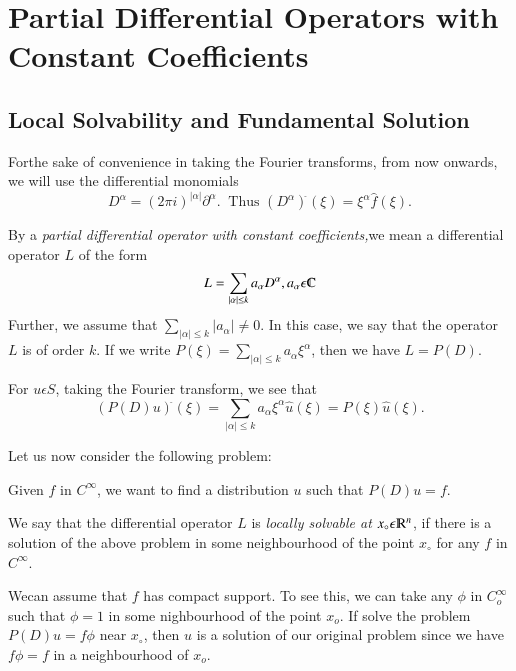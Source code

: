 \chapter{Partial Differential Operators with Constant
  Coefficients}\label{chap2} 

\section{Local Solvability and Fundamental Solution}\label{chap2:sec1}

For\pageoriginale the sake of convenience in taking the Fourier transforms, from now
onwards, we will use the differential monomials  
$$
D^{\alpha}= (2 \pi i)^{|\alpha|}\partial^{\alpha}. ~\text{ Thus }
(D^{\alpha})^{\hat{}}(\xi) = \xi^{\alpha} \hat{f}(\xi). 
$$

By a \textit{partial differential operator with constant
  coefficients,}we mean a differential operator $L$ of the form  
$$
L= \sum_{|\alpha| \leq k} a_{\alpha}D^{\alpha}, a_{\alpha} \epsilon \varmathbb{C}
$$
Further, we assume that $\sum \limits_{|\alpha| \leq k} |a_{\alpha}|
\neq 0$. In this case, we say that the operator $L$ is of order
$k$. If we write $P(\xi)= \sum\limits_{|\alpha| \leq k} a_{\alpha}
\xi^{\alpha}$, then we have $L = P(D)$. 

For $u \epsilon S$, taking the Fourier transform, we see that 
$$
(P(D)u)^{\hat{}} (\xi) = \sum \limits_{|\alpha| \leq k} a_{\alpha}
\xi^{\alpha} \hat{u}(\xi) = P(\xi) \hat{u}(\xi). 
$$


Let us now consider the following problem:

Given $f$ in $C^{\infty}$, we want to find a distribution $u$ such
that $P(D)u = f$. 

We say that the differential operator $L$ is \textit{locally solvable
  at } $x_\circ \epsilon \varmathbb{R}^n$, if there is a solution
of the above problem in some neighbourhood of the point $x_\circ$ for
any $f$ in $C^{\infty}$.  

\begin{rem}\label{chap2:sec1:rem2.1} %
  We\pageoriginale can assume that $f$ has compact support. To see this, we can take
  any $\phi$ in $C^{\infty}_{o}$ such that $\phi = 1$ in some
  nighbourhood of the point $x_o$. If solve the problem $P(D) u = f \phi
  $ near $x_\circ$, then $u$ is a solution of our original problem since
  we have $f \phi = f$ in a neighbourhood of $x_o$. 
\end{rem}

